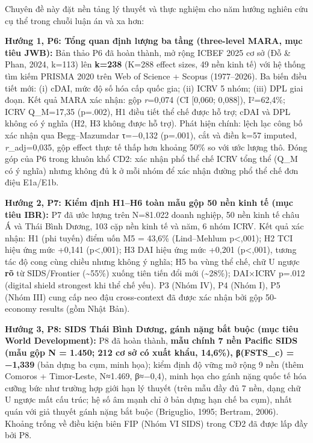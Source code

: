 \documentclass[
  a4paper,
  13pt]{extreport}
\begin{document}
Chuyên đề này đặt nền tảng lý thuyết và thực nghiệm cho năm hướng nghiên
cứu cụ thể trong chuỗi luận án và xa hơn:

\textbf{Hướng 1, P6: Tổng quan định lượng ba tầng (three-level MARA, mục
tiêu JWB):} Bản thảo P6 đã hoàn thành, mở rộng ICBEF 2025 cơ sở (Đỗ \&
Phan, 2024, k=113) lên \textbf{k=238} (K=288 effect sizes, 49 nền kinh
tế) với hệ thống tìm kiếm PRISMA 2020 trên Web of Science + Scopus
(1977--2026). Ba biến điều tiết mới: (i) cDAI, mức độ số hóa cấp quốc
gia; (ii) ICRV 5 nhóm; (iii) DPL giai đoạn. Kết quả MARA xác nhận: gộp
\emph{r}=0,074 (CI {[}0,060; 0,088{]}), I²=62,4\%; ICRV Q\_M=17,35
(p=.002), H1 điều tiết thể chế được hỗ trợ; cDAI và DPL không có ý nghĩa
(H2, H3 không được hỗ trợ). Phát hiện chính: lệch lạc công bố xác nhận
qua Begg--Mazumdar τ=−0,132 (p=.001), cắt và điền k=57 imputed,
\emph{r}\_adj=0,035, gộp effect thực tế thấp hơn khoảng 50\% so với ước
lượng thô. Đóng góp của P6 trong khuôn khổ CD2: xác nhận phổ thể chế
ICRV tổng thể (Q\_M có ý nghĩa) nhưng không đủ k ở mỗi nhóm để xác nhận
đường phổ thể chế đơn điệu E1a/E1b.

\textbf{Hướng 2, P7: Kiểm định H1--H6 toàn mẫu gộp 50 nền kinh tế (mục
tiêu IBR):} P7 đã ước lượng trên N=81.022 doanh nghiệp, 50 nền kinh tế
châu Á và Thái Bình Dương, 103 cặp nền kinh tế và năm, 6 nhóm ICRV. Kết
quả xác nhận: H1 (phi tuyến) điểm uốn M5 = 43,6\% (Lind--Mehlum
p\textless,001); H2 TCI hiệu ứng mức +0,141 (p\textless,001); H3 DAI
hiệu ứng mức +0,201 (p\textless,001), tương tác độ cong cùng chiều nhưng
không ý nghĩa; H5 ba vùng thể chế, chữ U ngược \textbf{rõ} từ
SIDS/Frontier (\textasciitilde55\%) xuống tiên tiến đổi mới
(\textasciitilde28\%); DAI×ICRV p=.012 (digital shield strongest khi thể
chế yếu). P3 (Nhóm IV), P4 (Nhóm I), P5 (Nhóm III) cung cấp neo đậu
cross-context đã được xác nhận bởi gộp 50-economy results (gồm Nhật
Bản).

\textbf{Hướng 3, P8: SIDS Thái Bình Dương, gánh nặng bắt buộc (mục tiêu
World Development):} P8 đã hoàn thành, \textbf{mẫu chính 7 nền Pacific
SIDS (mẫu gộp N = 1.450; 212 cơ sở có xuất khẩu, 14,6\%), β(FSTS\_c) =
−1,339} (bản dựng ba cụm, minh họa); kiểm định độ vững mở rộng 9 nền
(thêm Comoros + Timor-Leste, N≈1.469, β≈−0,4), minh họa cho gánh nặng
quốc tế hóa cưỡng bức như trường hợp giới hạn lý thuyết (trên mẫu đầy đủ
7 nền, dạng chữ U ngược mất cấu trúc; hệ số âm mạnh chỉ ở bản dựng hạn
chế ba cụm), nhất quán với giả thuyết gánh nặng bắt buộc (Briguglio,
1995; Bertram, 2006). Khoảng trống về điều kiện biên FIP (Nhóm VI SIDS)
trong CĐ2 đã được lấp đầy bởi P8.
\end{document}
